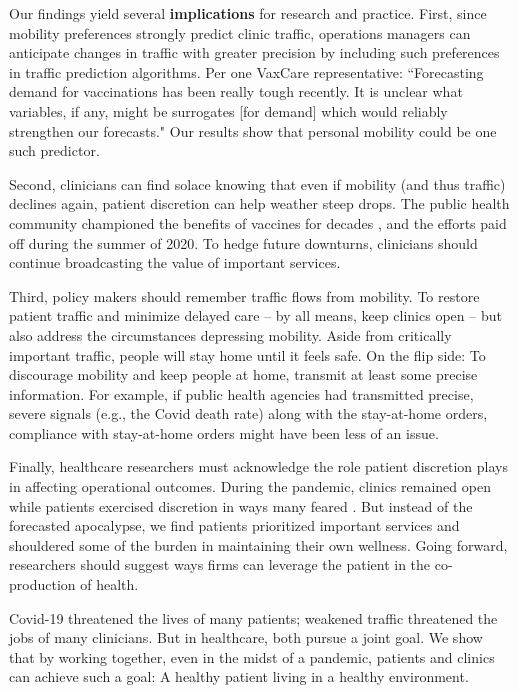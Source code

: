  Our findings yield several \textbf{implications} for research and practice. First, since mobility preferences strongly predict clinic traffic, operations managers can anticipate changes in traffic with greater precision by including such preferences in traffic prediction algorithms. Per one VaxCare representative: “Forecasting demand for vaccinations has been really tough recently. It is unclear what variables, if any, might be surrogates [for demand] which would reliably strengthen our forecasts." Our results show that personal mobility could be one such predictor. 
 
 Second, clinicians can find solace knowing that even if mobility (and thus traffic) declines again, patient discretion can help weather steep drops. The public health community championed the benefits of vaccines for decades \citep{Brewer2017}, and the efforts paid off during the summer of 2020. To hedge future downturns, clinicians should continue broadcasting the value of important services.
 
 Third, policy makers should remember traffic flows from mobility. To restore patient traffic and minimize delayed care -- by all means, keep clinics open -- but also address the circumstances depressing mobility. Aside from critically important traffic, people will stay home until it feels safe. On the flip side: To discourage mobility and keep people at home, transmit at least some precise information. For example, if public health agencies had transmitted precise, severe signals (e.g., the Covid death rate) along with the stay-at-home orders, compliance with stay-at-home orders might have been less of an issue. 
 
 Finally, healthcare researchers must acknowledge the role patient discretion plays in affecting operational outcomes. During the pandemic, clinics remained open while patients exercised discretion in ways many feared \citep{WSJ_famVacc}. But instead of the forecasted apocalypse, we find patients prioritized important services and shouldered some of the burden in maintaining their own wellness. Going forward, researchers should suggest ways firms can leverage the patient in the co-production of health.
 
 Covid-19 threatened the lives of many patients; weakened traffic threatened the jobs of many clinicians. But in healthcare, both pursue a joint goal. We show that by working together, even in the midst of a pandemic, patients and clinics can achieve such a goal: A healthy patient living in a healthy environment.

